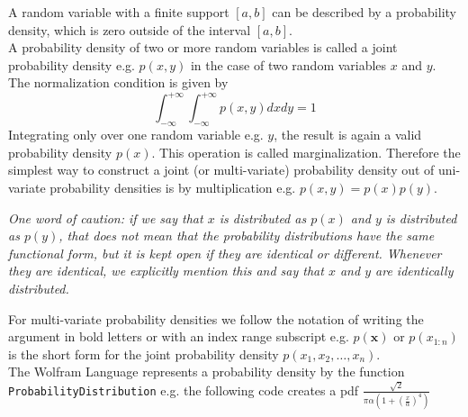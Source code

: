 \documentclass{tstextbook}
\begin{document}
A random variable with a finite support $[a,b]$ can be described by a probability density, which is zero outside of the interval $[a,b]$.\\

A probability density of two or more random variables is called a joint probability density e.g. $p(x,y)$ in the case of two random variables $x$ and $y$. The normalization condition is given by 
  \begin{equation}
    \int_{-\infty}^{+\infty}\int_{-\infty}^{+\infty}p(x,y)dxdy=1
  \end{equation}
Integrating only over one random variable e.g. $y$, the result is again a valid probability density $p(x)$. This operation is called marginalization. Therefore the simplest way to construct a joint (or multi-variate) probability density out of uni-variate probability densities is by multiplication e.g. $p(x,y)=p(x)p(y)$.

\begin{remark}
\textit{One word of caution: if we say that $x$ is distributed as $p(x)$ and $y$ is distributed as $p(y)$, that does not mean that the probability distributions have the same functional form, but it is kept open if they are identical or different. Whenever they are identical, we explicitly mention this and say that $x$ and $y$ are identically distributed.}
\end{remark}

For multi-variate probability densities we follow the notation of writing the argument in bold letters or with an index range subscript e.g. $p(\mathbf{x})$ or $p(x_{1:n})$ is the short form for the joint probability density $p(x_1,x_2,\ldots,x_n)$. \\

The Wolfram Language represents a probability density by the function \texttt{ProbabilityDistribution} e.g. the following code creates a pdf $\frac{\sqrt{2}}{\pi\alpha\left(1+\left(\frac{x}{\alpha}\right)^4\right)}$
\end{document}
